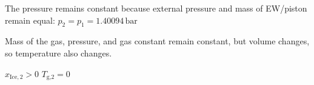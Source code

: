 The pressure remains constant because external pressure and mass of EW/piston remain equal:  
\( p_2 = p_1 = 1.40094 \, \text{bar} \)  

Mass of the gas, pressure, and gas constant remain constant, but volume changes, so temperature also changes.  

\( x_{\text{Ice},2} > 0 \)  
\( T_{\text{g,2}} = 0 \)